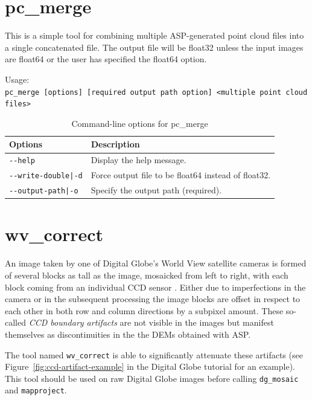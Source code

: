 \section{pc\_merge}
\label{pcmerge}

This is a simple tool for combining multiple ASP-generated point cloud files into
a single concatenated file.  The output file will be float32 unless the input images
are float64 or the user has specified the float64 option.


\medskip

Usage:\\
\hspace*{2em}\texttt{pc\_merge [options] [required output path option] <multiple point cloud files>}

\medskip

\begin{longtable}{|l|p{10cm}|}
\caption{Command-line options for pc\_merge}
\label{tbl:pcmerge}
\endfirsthead
\endhead
\endfoot
\endlastfoot
\hline
Options & Description \\ \hline \hline
\texttt{-\/-help} & Display the help message.\\ \hline
\texttt{-\/-write-double|-d} & Force output file to be float64 instead of float32.\\ \hline
\texttt{-\/-output-path|-o} & Specify the output path (required).\\ \hline
\end{longtable}




\section{wv\_correct}
\label{wvcorrect}

An image taken by one of Digital Globe's World View satellite cameras is
formed of several blocks as tall as the image, mosaicked from left to
right, with each block coming from an individual CCD sensor
\cite{digital-globe:camera}. Either due to imperfections in the camera
or in the subsequent processing the image blocks are offset in
respect to each other in both row and column directions by a subpixel
amount. These so-called {\it CCD boundary artifacts} are not visible in
the images but manifest themselves as discontinuities in the the DEMs
obtained with ASP.

The tool named \texttt{wv\_correct} is able to significantly attenuate
these artifacts (see Figure~\ref{fig:ccd-artifact-example} in the
Digital Globe tutorial for an example). This tool should be used on raw
Digital Globe images before calling \texttt{dg\_mosaic} and
\texttt{mapproject}.

